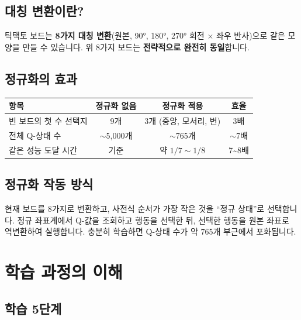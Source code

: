 \documentclass[11pt,a4paper]{article}
\begin{document}
\subsection{대칭 변환이란?}

틱택토 보드는 \textbf{8가지 대칭 변환}(원본, 90°, 180°, 270° 회전 $\times$ 좌우 반사)으로 같은 모양을 만들 수 있습니다. 위 8가지 보드는 \textbf{전략적으로 완전히 동일}합니다.

\subsection{정규화의 효과}

\begin{center}
\renewcommand{\arraystretch}{1.4}
\begin{tabular}{|l|c|c|c|}
\hline
\rowcolor{tableheader}
\textbf{항목} & \textbf{정규화 없음} & \textbf{정규화 적용} & \textbf{효율} \\
\hline
빈 보드의 첫 수 선택지 & 9개 & 3개 (중앙, 모서리, 변) & 3배 \\
\hline
전체 Q-상태 수 & $\sim$5,000개 & $\sim$765개 & $\sim$7배 \\
\hline
같은 성능 도달 시간 & 기준 & 약 $1/7\sim1/8$ & 7\textasciitilde8배 \\
\hline
\end{tabular}
\end{center}

\subsection{정규화 작동 방식}

현재 보드를 8가지로 변환하고, 사전식 순서가 가장 작은 것을 ``정규 상태''로 선택합니다. 정규 좌표계에서 Q-값을 조회하고 행동을 선택한 뒤, 선택한 행동을 원본 좌표로 역변환하여 실행합니다. 충분히 학습하면 Q-상태 수가 약 765개 부근에서 포화됩니다.

\section{학습 과정의 이해}

\subsection{학습 5단계}
\end{document}
